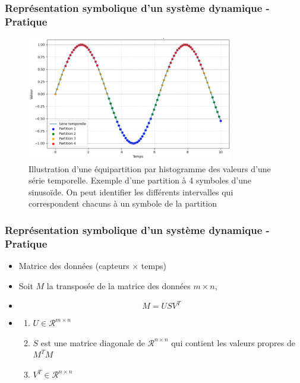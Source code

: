 \documentclass{beamer}
\begin{document}
\begin{frame}
\frametitle{Représentation symbolique d'un système dynamique - Pratique}
\begin{figure}[!ht]
    \centering
    \includegraphics[width=09cm]{partition_serie_temporelle.png}
    \caption{Illustration d'une équipartition par histogramme des valeurs d'une série temporelle. Exemple d'une partition à 4 symboles d'une sinusoïde. On peut identifier les différents intervalles qui correspondent chacuns à un symbole de la partition}
    \label{fig4.2}
\end{figure}
\end{frame}

\begin{frame}
\frametitle{Représentation symbolique d'un système dynamique - Pratique}
\begin{itemize}
\item <1> Matrice des données (capteurs $\times$ temps)

\item <2-> Soit $M$ la transposée de la matrice des données $m \times n$,

\item<3-> 
\begin{equation}
	M = USV^T
\end{equation}

\item<4->
\begin{enumerate}
	\item $U \in \mathcal{R}^{m \times n}$ 
	\item $S$ est une matrice diagonale de $\mathcal{R}^{n \times n}$ qui contient les valeurs propres de $M^TM$
	\item $V^T \in \mathcal{R}^{n \times n}$ 
\end{enumerate}
\end{itemize}
\end{frame}
\end{document}

